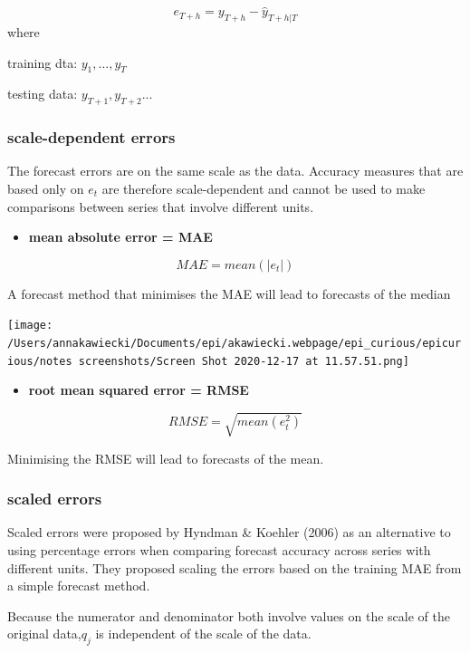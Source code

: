 \documentclass[
]{article}
\providecommand{\tightlist}{%
  \setlength{\itemsep}{0pt}\setlength{\parskip}{0pt}}
\begin{document}
\[e_{T+h}= y_{T+h} - \hat{y}_{T+h|T}\] where

training dta: \(y_1,...,y_T\)

testing data: \(y_{T+1},y_{T+2}...\)

\hypertarget{scale-dependent-errors}{%
\subsubsection{scale-dependent errors}\label{scale-dependent-errors}}

The forecast errors are on the same scale as the data. Accuracy measures
that are based only on \(e_{t}\) are therefore scale-dependent and
cannot be used to make comparisons between series that involve different
units.

\begin{itemize}
\tightlist
\item
  \textbf{mean absolute error = MAE}
\end{itemize}

\[MAE= mean(|e_{t}|)\]

A forecast method that minimises the MAE will lead to forecasts of the
median

\texttt{[image: /Users/annakawiecki/Documents/epi/akawiecki.webpage/epi\_curious/epicurious/notes screenshots/Screen Shot 2020-12-17 at 11.57.51.png]}

\begin{itemize}
\tightlist
\item
  \textbf{root mean squared error = RMSE}
\end{itemize}

\[RMSE= \sqrt{mean(e_{t}^2)}\]

Minimising the RMSE will lead to forecasts of the mean.

\hypertarget{scaled-errors}{%
\subsubsection{scaled errors}\label{scaled-errors}}

Scaled errors were proposed by Hyndman \& Koehler (2006) as an
alternative to using percentage errors when comparing forecast accuracy
across series with different units. They proposed scaling the errors
based on the training MAE from a simple forecast method.

Because the numerator and denominator both involve values on the scale
of the original data,\(q_{j}\) is independent of the scale of the data.
\end{document}
